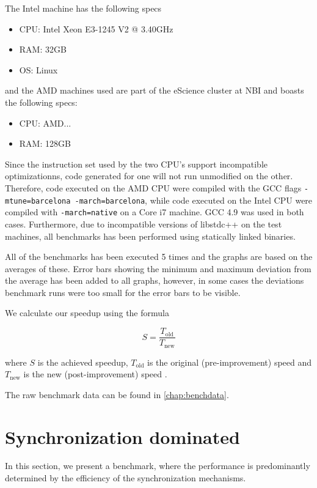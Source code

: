 The Intel machine has the following specs
\begin{itemize}
\item CPU: Intel Xeon E3-1245 V2 @ 3.40GHz
\item RAM: 32GB
\item OS: Linux
\end{itemize}

and the AMD machines used are part of the eScience cluster at NBI and
boasts the following specs:
\begin{itemize}
  \item CPU: AMD...
  \item RAM: 128GB
  \end{itemize}

Since the instruction set used by the two CPU's support incompatible
optimizationns, code generated for one will not run unmodified on the
other. Therefore, code executed on the AMD CPU were compiled with the
GCC flags \texttt{-mtune=barcelona -march=barcelona}, while code
executed on the Intel CPU were compiled with \texttt{-march=native} on
a Core i7 machine. GCC 4.9 was used in both cases. Furthermore,
due to incompatible versions of libstdc++ on the test machines, all
benchmarks has been performed using statically linked binaries.

All of the benchmarks has been executed 5 times and the graphs are
based on the averages of these. Error bars showing the minimum and
maximum deviation from the average has been added to all graphs,
however, in some cases the deviations benchmark runs were too small
for the error bars to be visible.

We calculate our speedup using the formula

\begin{equation*}
S = \frac{T_{\text{old}}}{T_{\text{new}}}
\end{equation*}

where $S$ is the achieved speedup, $T_{\text{old}}$ is the original
(pre-improvement) speed and $T_{\text{new}}$ is the new
(post-improvement) speed \cite{hennessy2012computer}.

The raw benchmark data can be found in \cref{chap:benchdata}.

\section{Synchronization dominated}
In this section, we present a benchmark, where the performance is
predominantly determined by the efficiency of the synchronization
mechanisms.

